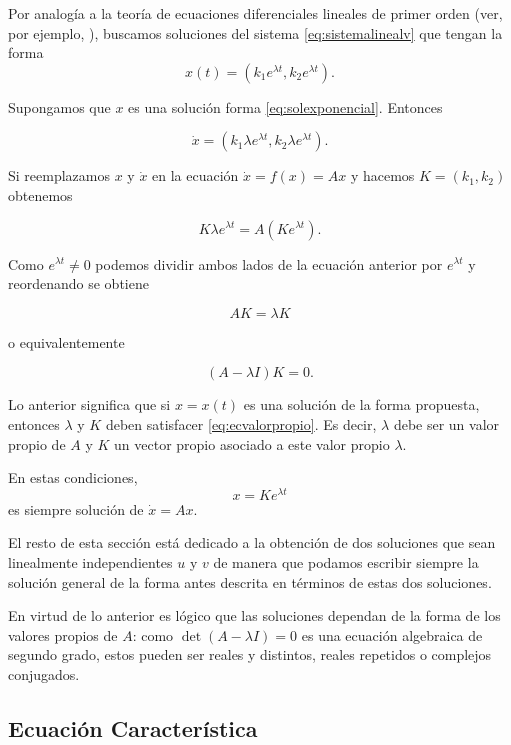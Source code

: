 Por analogía a la teoría de ecuaciones diferenciales lineales de primer orden (ver, por ejemplo, \cite{zillcull,boycediprima}), buscamos soluciones del sistema \ref{eq:sistemalinealv} que tengan la forma
\begin{equation} \label{eq:solexponencial}
x(t) = (k_1e^{\lambda t}, k_2e^{\lambda t}).
\end{equation}

Supongamos que $x$ es una solución forma \ref{eq:solexponencial}. Entonces

$$ \dot{x} = (k_1 \lambda e^{\lambda t}, k_2 \lambda e^{\lambda t}). $$

Si reemplazamos $x$ y $\dot{x}$ en la ecuación $\dot{x} = f(x) = Ax$ y hacemos $K = (k_1, k_2)$ obtenemos

$$
	K \lambda e^{\lambda t} = A (Ke^{\lambda t}).
$$

Como $e^{\lambda t} \neq 0$ podemos dividir ambos lados de la ecuación anterior por $e^{\lambda t}$ y reordenando se obtiene

$$ AK = \lambda K$$

o equivalentemente

\begin{equation} \label{eq:ecvalorpropio}
	(A - \lambda I) K = 0.
\end{equation}

Lo anterior significa que si $x = x(t)$ es una solución de la forma propuesta, entonces $\lambda$ y $K$ deben satisfacer \ref{eq:ecvalorpropio}. Es decir, $\lambda$ debe ser un valor propio de $A$ y $K$ un vector propio asociado a este valor propio $\lambda$.

En estas condiciones, $$ x = K e^{\lambda t}$$ es siempre solución de $\dot{x} = Ax$.

El resto de esta sección está dedicado a la obtención de dos soluciones que sean linealmente independientes $u$ y $v$ de manera que podamos escribir siempre la solución general de la forma antes descrita en términos de estas dos soluciones.

En virtud de lo anterior es lógico que las soluciones dependan de la forma de los valores propios de $A$: como $\det(A - \lambda I) = 0$ es una ecuación algebraica de segundo grado, estos pueden ser reales y distintos, reales repetidos o complejos conjugados.

\subsection{Ecuación Característica}


